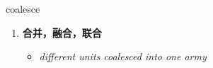 
\begin{frame}
{\huge coalesce}
\begin{center}
\begin{enumerate}\Large
  \item \textbf{合并，融合，联合}
  \begin{itemize}
    \item \em{\Large{different units coalesced into one army}}
  \end{itemize}
\end{enumerate}
\end{center}
\end{frame}
